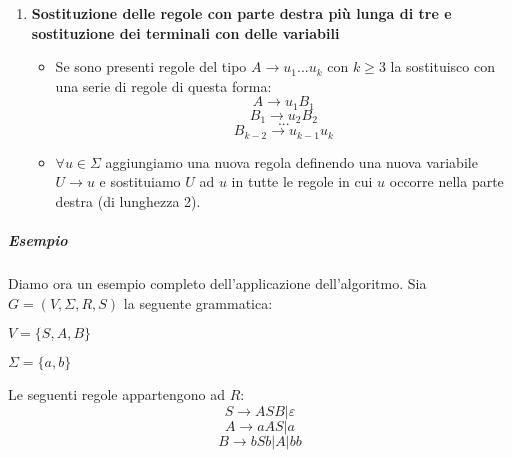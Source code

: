 \begin{description}
\begin{enumerate}
\begin{description}
\begin{itemize}
						\end{itemize}
				\end{description}		
			\item \textbf{Sostituzione delle regole con parte destra pi\`u lunga di tre e sostituzione dei terminali con delle variabili}
				\begin{itemize}
					\item Se sono presenti regole del tipo $A \to u_1 ... u_k$ con $k \geq 3$ la sostituisco con una serie di regole di questa forma: 
					\[
						A \to u_1B_1					
					\]
					\[
						B_1 \to u_2B_2					
					\]
					\[
						...					
					\]
					\[
						B_{k-2} \to u_{k-1}u_k					
					\]
					\item $\forall u \in \Sigma$ aggiungiamo una nuova regola definendo una nuova variabile $U \to u$ e sostituiamo $U$ ad $u$ in tutte le regole in cui $u$ occorre nella parte destra (di lunghezza 2).
				\end{itemize}
		\end{enumerate}
\end{description}
\subparagraph{Esempio} Diamo ora un esempio completo dell'applicazione dell'algoritmo.\newline
Sia $G = (V, \Sigma, R, S)$ la seguente grammatica:
\begin{description}
	\item $V = \{S, A, B\}$
	\item $\Sigma = \{a, b\}$
	\item Le seguenti regole appartengono ad $R$:
	\[S \to ASB | \varepsilon \]
	\[A \to aAS | a \]
	\[B \to bSb | A | bb\]
\end{description}
